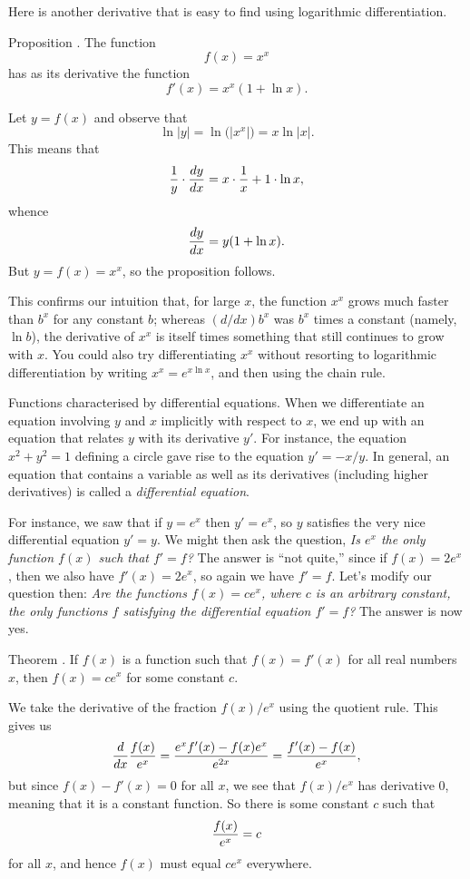 Here is another derivative that is easy to find using logarithmic differentiation.

\proclaim Proposition \advthm. The function
$$f(x) = x^x$$
has as its derivative the function
$$f'(x) = x^x(1+\ln x).$$

\proof Let $y=f(x)$ and observe that
$$\ln|y| = \ln\bigl(|x^x|\bigr) = x\ln|x|.$$
This means that
$${1\over y} \cdot {dy\over dx} = x\cdot {1\over x} + 1\cdot\ln x,$$
whence
$${dy\over dx} = y (1+\ln x).$$
But $y=f(x) = x^x$, so the proposition follows.\slug

This confirms our intuition that, for large $x$, the function $x^x$ grows much faster than $b^x$
for any constant $b$; whereas $(d/dx)b^x$ was $b^x$ times a constant (namely, $\ln b$),
the derivative of $x^x$ is itself times something that still continues to grow with $x$.
You could also try differentiating $x^x$ without resorting to logarithmic differentiation by writing
$x^x = e^{x\ln x}$, and then using the chain rule.

\medskip\boldlabel Functions characterised by differential equations.
When we differentiate an equation involving $y$ and $x$ implicitly with respect to $x$, we end up with
an equation that relates $y$ with its derivative $y'$. For instance, the equation $x^2 + y^2 = 1$ defining
a circle gave rise to the equation $y' = -x/y$. In general, an equation that contains a variable
as well as its derivatives (including higher derivatives) is called a {\it differential equation}.

For instance, we saw that if $y = e^x$ then $y' = e^x$, so $y$ satisfies the very nice differential equation
$y' = y$. We might then ask the question, {\sl Is $e^x$ the only function $f(x)$ such that $f' = f$?}
The answer is ``not quite,'' since if
$f(x) = 2e^x$, then we also have $f'(x) = 2e^x$, so again we have $f' = f$. Let's modify our
question then: {\sl Are the functions $f(x) = ce^x$, where $c$ is an arbitrary constant, the only functions $f$
satisfying the differential equation $f'=f$?} The answer is now yes.

\edef\thmexpdiffeq{\the\thmcount}
\proclaim Theorem \advthm. If $f(x)$ is a function such that $f(x) = f'(x)$ for all real numbers $x$,
then $f(x) = ce^x$ for some constant $c$.

\proof We take the derivative of the fraction $f(x)/e^x$ using the quotient rule. This gives us
$${d\over dx} {f(x)\over e^x} = {e^x f'(x) - f(x) e^x\over e^{2x}} = {f'(x) - f(x)\over e^x},$$
but since $f(x)-f'(x) = 0$ for all $x$, we see that $f(x)/e^x$ has derivative $0$, meaning that it is
a constant function. So there is some constant $c$ such that
$${f(x) \over e^x} = c$$
for all $x$, and hence $f(x)$ must equal $ce^x$ everywhere.\slug

